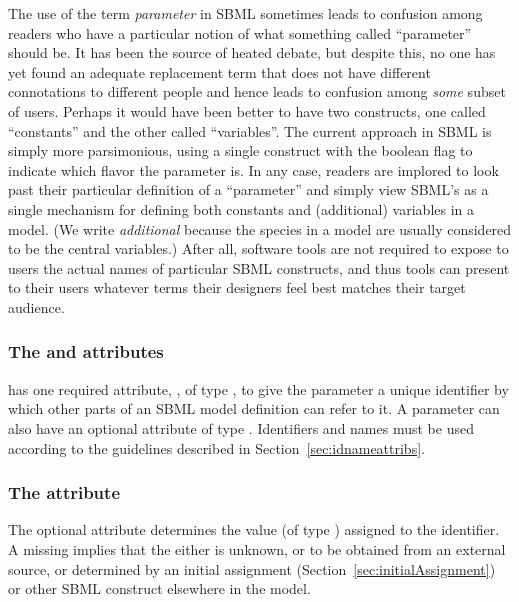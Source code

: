 The use of the term \emph{parameter} in SBML sometimes leads to
confusion among readers who have a particular notion of what
something called ``parameter'' should be.  It has been the source
of heated debate, but despite this, no one has yet found an
adequate replacement term that does not have different
connotations to different people and hence leads to confusion
among \emph{some} subset of users.  Perhaps it would have been
better to have two constructs, one called ``constants'' and the
other called ``variables''.  The current approach in SBML is
simply more parsimonious, using a single \Parameter construct with
the boolean flag  to indicate which flavor the
parameter is.  In any case, readers are implored to look past
their particular definition of a ``parameter'' and simply view
SBML's \Parameter as a single mechanism for defining both
constants and (additional) variables in a model.  (We write
\emph{additional} because the species in a model are usually
considered to be the central variables.)  After all, software
tools are not required to expose to users the actual names of
particular SBML constructs, and thus tools can present to their
users whatever terms their designers feel best matches their
target audience.


\subsubsection{The  and  attributes}

\Parameter has one required attribute, , of type
, to give the parameter a unique identifier by which
other parts of an SBML model definition can refer to it.  A
parameter can also have an optional  attribute of type
.  Identifiers and names must be used according
to the guidelines described in Section~\ref{sec:idnameattribs}.


\subsubsection{The  attribute}
\label{sec:parameter-value}

The optional attribute  determines the value (of type
) assigned to the identifier.  A missing
 implies that the  either is unknown, or
to be obtained from an external source, or determined by an
initial assignment (Section~\ref{sec:initialAssignment}) or 
other SBML construct elsewhere in the model.


